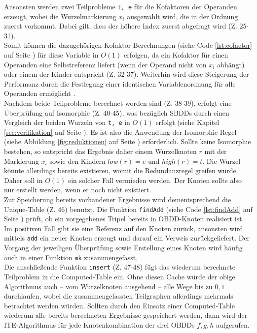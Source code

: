 Ansonsten werden zwei Teilprobleme \texttt{t, e} für die Kofaktoren der Operanden erzeugt, wobei die Wurzelmarkierung $x_i$ ausgewählt wird, die in der Ordnung zuerst vorkommt. Dabei gilt, dass der höhere Index zuerst abgefragt wird (Z. 25-31).\\
Somit können die dazugehörigen Kofaktor-Berechnungen (siehe Code \ref{lst:cofactor} auf Seite \pageref{lst:cofactor}) für diese Variable in $O(1)$ erfolgen, da ein Kofaktor für einen Operanden eine Selbstreferenz liefert (wenn der Operand nicht von $x_i$ abhängt) oder einem der \glqq Kinder\grqq{} entspricht (Z. 32-37). Weiterhin wird diese Steigerung der Performanz durch die Festlegung einer identischen Variablenordnung für alle Operanden ermöglicht \cite[S.37-38]{h2002}.\\
Nachdem beide Teilprobleme berechnet worden sind (Z. 38-39), erfolgt eine Überprüfung auf Isomorphie (Z. 40-45), was bezüglich SBDDs durch einen Vergleich der beiden Wurzeln von \texttt{t, e} in $O(1)$ erfolgt (siehe Kapitel \ref{sec:verifikation} auf Seite \pageref{sec:verifikation}). Es ist also die Anwendung der Isomorphie-Regel (siehe Abbildung \ref{fig:reduktionen} auf Seite \pageref{fig:reduktionen}) erforderlich. Sollte keine Isomorphie bestehen, so entspricht das Ergebnis daher einem Wurzelknoten $r$ mit der Markierung $x_i$ sowie den \glqq Kindern\grqq{} $low(r) = e$ und $high(r) = t$. Die Wurzel könnte allerdings bereits existieren, womit die Redundanzregel greifen würde. Daher soll in $O(1)$ ein solcher Fall vermieden werden. Der Knoten sollte also nur erstellt werden, wenn er noch nicht existiert.\\
Zur Speicherung bereits vorhandener Ergebnisse wird dementsprechend die Unique-Table (Z. 46) benutzt. Die Funktion \texttt{findAdd} (siehe Code \ref{lst:findAdd} auf Seite \pageref{lst:findAdd}) prüft, ob ein vorgegebenes Tripel bereits in OBDD-Knoten realisiert ist. Im positiven Fall gibt sie eine Referenz auf den Knoten zurück, ansonsten wird  mittels \texttt{add} ein neuer Knoten erzeugt und darauf ein Verweis zurückgeliefert. Der Vorgang der jeweiligen Überprüfung sowie Erstellung eines Knoten wird häufig auch in einer Funktion \texttt{mk} zusammengefasst.\\
Die anschließende Funktion \texttt{insert} (Z. 47-48) fügt das wiederum berechnete Teilproblem in die Computed-Table ein. Ohne diesen Cache würde der obige Algorithmus auch -- vom Wurzelknoten ausgehend -- alle Wege bis zu $0, 1$ durchlaufen, wobei die zusammengefassten Teilgraphen allerdings mehrmals betrachtet werden würden. Sollten durch den Einsatz einer Computed-Table wiederum alle bereits berechneten Ergebnisse gespeichert werden, dann wird der ITE-Algorithmus für jede Knotenkombination der drei OBDDs $f, g, h$ aufgerufen.\\
